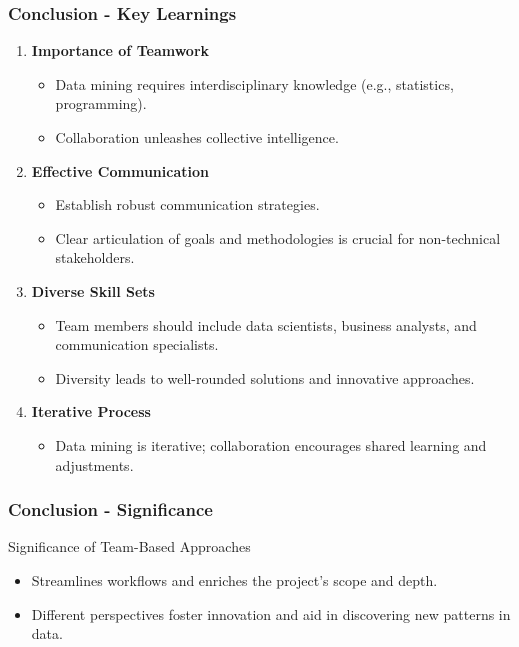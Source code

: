 \documentclass[aspectratio=169]{beamer}
\begin{document}
\begin{frame}[fragile]
    \frametitle{Conclusion - Key Learnings}
    \begin{enumerate}
        \item \textbf{Importance of Teamwork}
        \begin{itemize}
            \item Data mining requires interdisciplinary knowledge (e.g., statistics, programming).
            \item Collaboration unleashes collective intelligence.
        \end{itemize}

        \item \textbf{Effective Communication}
        \begin{itemize}
            \item Establish robust communication strategies.
            \item Clear articulation of goals and methodologies is crucial for non-technical stakeholders.
        \end{itemize}

        \item \textbf{Diverse Skill Sets}
        \begin{itemize}
            \item Team members should include data scientists, business analysts, and communication specialists.
            \item Diversity leads to well-rounded solutions and innovative approaches.
        \end{itemize}

        \item \textbf{Iterative Process}
        \begin{itemize}
            \item Data mining is iterative; collaboration encourages shared learning and adjustments.
        \end{itemize}
    \end{enumerate}
\end{frame}

\begin{frame}[fragile]
    \frametitle{Conclusion - Significance}
    \begin{block}{Significance of Team-Based Approaches}
        \begin{itemize}
            \item Streamlines workflows and enriches the project’s scope and depth.
            \item Different perspectives foster innovation and aid in discovering new patterns in data.
        \end{itemize}
    \end{block}
\end{frame}
\end{document}

